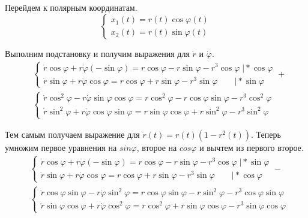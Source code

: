 Перейдем к полярным координатам.
\begin{equation}
  \begin{cases}
    x_1(t)=r(t)\cos{\varphi(t)}\\
    x_2(t)=r(t)\sin{\varphi(t)}
  \end{cases}
\end{equation}

Выполним подстановку и получим выражения для $\dot{r}$ и $\dot{\varphi}$.
\begin{align}
  &\begin{cases}
    \dot{r}\cos{\varphi}+r\dot{\varphi}(-\sin{\varphi})=r\cos{\varphi}-r\sin{\varphi}-r^3\cos{\varphi}\;\big|*\cos{\varphi}\\
    \dot{r}\sin{\varphi}+r\dot{\varphi}\cos{\varphi}=r\cos{\varphi}+r\sin{\varphi}-r^3\sin{\varphi}\quad\quad\big|*\sin{\varphi}
  \end{cases}+\\
  &\begin{cases}
    \dot{r}\cos^2{\varphi}-r\dot{\varphi}\sin{\varphi}\cos{\varphi}=
    r\cos^2{\varphi}-r\cos{\varphi}\sin{\varphi}-r^3\cos^2{\varphi}\\
    \dot{r}\sin^2{\varphi}+r\dot{\varphi}\cos{\varphi}\sin{\varphi}=
    r\sin{\varphi}\cos{\varphi}+r\sin^2{\varphi}-r^3\sin^2{\varphi}
  \end{cases}
\end{align}

Тем самым получаем выражение для $\dot{r}(t)=r(t)(1-r^2(t))$. Теперь умножим первое уравнения на $sin{\varphi}$,
второе на $cos{\varphi}$ и вычтем из первого второе.
\begin{align}
  &\begin{cases}
    \dot{r}\cos{\varphi}+r\dot{\varphi}(-\sin{\varphi})=r\cos{\varphi}-r\sin{\varphi}-r^3\cos{\varphi}\;\big|*\sin{\varphi}\\
    \dot{r}\sin{\varphi}+r\dot{\varphi}\cos{\varphi}=r\cos{\varphi}+r\sin{\varphi}-r^3\sin{\varphi}\quad\quad\big|*\cos{\varphi}
  \end{cases}-\\
  &\begin{cases}
    \dot{r}\cos{\varphi}\sin{\varphi}-r\dot{\varphi}\sin^2{\varphi}=
    r\cos{\varphi}\sin{\varphi}-r\sin^2{\varphi}-r^3\cos{\varphi}\sin{\varphi}\\
    \dot{r}\sin{\varphi}\cos{\varphi}+r\dot{\varphi}\cos^2{\varphi}=
    r\cos^2{\varphi}+r\sin{\varphi}\cos{\varphi}-r^3\sin{\varphi}\cos{\varphi}
  \end{cases}
\end{align}

